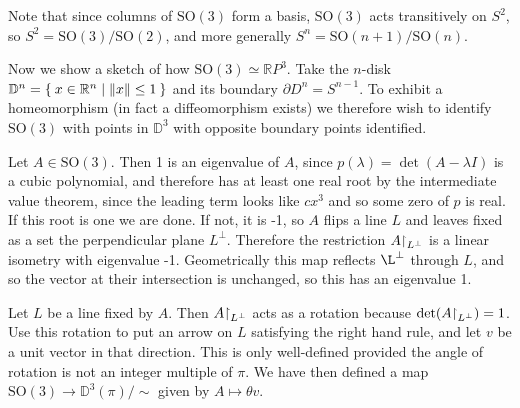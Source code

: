 Note that since columns of $\mathrm{SO}(3)$ form a basis,
$\mathrm{SO}(3)$ acts transitively on $S^2$, so
$S^2 = \mathrm{SO}(3) / \mathrm{SO}(2)$, and more generally
$S^n = \mathrm{SO}(n+1) / \mathrm{SO}(n)$.

Now we show a sketch of how $\mathrm{SO}(3) \simeq \mathbb{R}P^3$.
Take the $n$-disk
$\mathbb{D}^n = \Set{ x \in \mathbb{R}^n | \| x \| \leq 1 }$ and its
boundary $\partial D^n = S^{n-1}$. To exhibit a homeomorphism (in fact
a diffeomorphism exists) we therefore wish to identify
$\mathrm{SO}(3)$ with points in $\mathbb{D}^3$ with opposite boundary
points identified.

Let $A \in \mathrm{SO}(3)$. Then 1 is an eigenvalue of $A$, since
$p(\lambda) = \det(A - \lambda I)$ is a cubic polynomial, and
therefore has at least one real root by the intermediate value
theorem, since the leading term looks like $cx^3$ and so some zero of
$p$ is real. If this root is one we are done. If not, it is -1, so
$A$ flips a line $L$ and leaves fixed as a set the perpendicular plane
$L^\perp$. Therefore the restriction $A\mathord{\upharpoonright}_{L^\perp}$ is a
linear isometry with eigenvalue -1. Geometrically this map reflects
$\L^\perp$ through $L$, and so the vector at their intersection is
unchanged, so this has an eigenvalue 1.

Let $L$ be a line fixed by $A$. Then $A\mathord{\upharpoonright}_{L^\perp}$ acts as a
rotation because $\det(A\mathord{\upharpoonright}_{L^\perp}) = 1$. Use this rotation
to put an arrow on $L$ satisfying the right hand rule, and let $v$ be
a unit vector in that direction. This is only well-defined provided
the angle of rotation is not an integer multiple of $\pi$. We have
then defined a map $\mathrm{SO}(3) \to \mathbb{D}^3(\pi) / \sim$ given
by
$A \mapsto \theta v$.
